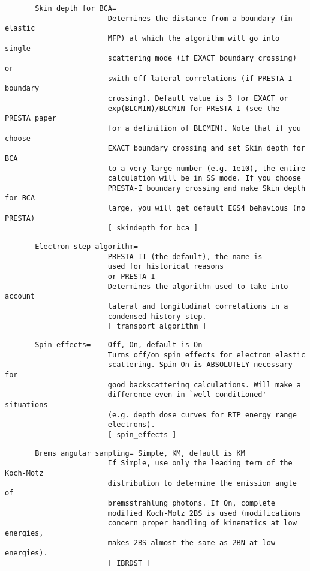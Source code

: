 \begin{verbatim}
       Skin depth for BCA=
                        Determines the distance from a boundary (in elastic
                        MFP) at which the algorithm will go into single
                        scattering mode (if EXACT boundary crossing) or
                        swith off lateral correlations (if PRESTA-I boundary
                        crossing). Default value is 3 for EXACT or
                        exp(BLCMIN)/BLCMIN for PRESTA-I (see the PRESTA paper
                        for a definition of BLCMIN). Note that if you choose
                        EXACT boundary crossing and set Skin depth for BCA
                        to a very large number (e.g. 1e10), the entire
                        calculation will be in SS mode. If you choose
                        PRESTA-I boundary crossing and make Skin depth for BCA
                        large, you will get default EGS4 behavious (no PRESTA)
                        [ skindepth_for_bca ]
\end{verbatim}
\begin{verbatim}
       Electron-step algorithm=
                        PRESTA-II (the default), the name is
                        used for historical reasons
                        or PRESTA-I
                        Determines the algorithm used to take into account
                        lateral and longitudinal correlations in a
                        condensed history step.
                        [ transport_algorithm ]
\end{verbatim}
\begin{verbatim}
       Spin effects=    Off, On, default is On
                        Turns off/on spin effects for electron elastic
                        scattering. Spin On is ABSOLUTELY necessary for
                        good backscattering calculations. Will make a
                        difference even in `well conditioned' situations 
                        (e.g. depth dose curves for RTP energy range 
                        electrons).
                        [ spin_effects ]
\end{verbatim}
\begin{verbatim}
       Brems angular sampling= Simple, KM, default is KM 
                        If Simple, use only the leading term of the Koch-Motz
                        distribution to determine the emission angle of 
                        bremsstrahlung photons. If On, complete
                        modified Koch-Motz 2BS is used (modifications
                        concern proper handling of kinematics at low energies,
                        makes 2BS almost the same as 2BN at low energies).
                        [ IBRDST ]
\end{verbatim}
